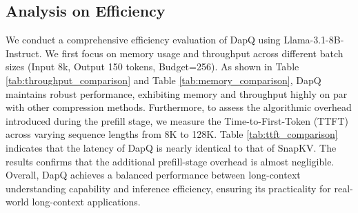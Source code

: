 
\subsection{Analysis on Efficiency}
We conduct a comprehensive efficiency evaluation of DapQ using Llama-3.1-8B-Instruct. We first focus on memory usage and throughput across different batch sizes (Input 8k, Output 150 tokens, Budget=256). As shown in Table \ref{tab:throughput_comparison} and Table \ref{tab:memory_comparison}, DapQ maintains robust performance, exhibiting memory and throughput highly on par with other compression methods. Furthermore, to assess the algorithmic overhead introduced during the prefill stage, we measure the Time-to-First-Token (TTFT) across varying sequence lengths from 8K to 128K. Table \ref{tab:ttft_comparison} indicates that the latency of DapQ is nearly identical to that of SnapKV. The results confirms that the additional prefill-stage overhead is almost negligible. Overall, DapQ achieves a balanced performance between long-context understanding capability and inference efficiency, ensuring its practicality for real-world long-context applications.









